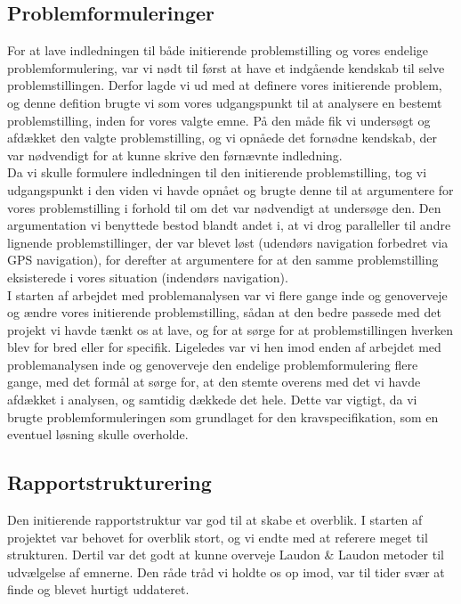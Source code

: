 \documentclass[a4paper,12pt,oneside,article]{memoir}
\begin{document}
        \subsection{Problemformuleringer}

        For at lave indledningen til både initierende problemstilling og vores endelige problemformulering, var vi nødt til først at have et indgående kendskab til selve problemstillingen. Derfor lagde vi ud med at definere vores initierende problem, og denne defition brugte vi som vores udgangspunkt til at analysere en bestemt problemstilling, inden for vores valgte emne. På den måde fik vi undersøgt og afdækket den valgte problemstilling, og vi opnåede det fornødne kendskab, der var nødvendigt for at kunne skrive den førnævnte indledning.\\
        Da vi skulle formulere indledningen til den initierende problemstilling, tog vi udgangspunkt i den viden vi havde opnået og brugte denne til at argumentere for vores problemstilling i forhold til om det var nødvendigt at undersøge den. Den argumentation vi benyttede bestod blandt andet i, at vi drog paralleller til andre lignende problemstillinger, der var blevet løst (udendørs navigation forbedret via GPS navigation), for derefter at argumentere for at den samme problemstilling eksisterede i vores situation (indendørs navigation).\\
        I starten af arbejdet med problemanalysen var vi flere gange inde og genoverveje og ændre vores initierende problemstilling, sådan at den bedre passede med det projekt vi havde tænkt os at lave, og for at sørge for at problemstillingen hverken blev for bred eller for specifik.
        Ligeledes var vi hen imod enden af arbejdet med problemanalysen inde og genoverveje den endelige problemformulering flere gange, med det formål at sørge for, at den stemte overens med det vi havde afdækket i analysen, og samtidig dækkede det hele. Dette var vigtigt, da vi brugte problemformuleringen som grundlaget for den kravspecifikation, som en eventuel løsning skulle overholde.

        

        

        

\subsection{Rapportstrukturering}

Den initierende rapportstruktur var god til at skabe et overblik. I starten af projektet var behovet for overblik stort, og vi endte med at referere meget til strukturen. Dertil var det godt at kunne overveje Laudon \& Laudon metoder til udvælgelse af emnerne. Den råde tråd vi holdte os op imod, var til tider svær at finde og blevet hurtigt uddateret.
\end{document}
